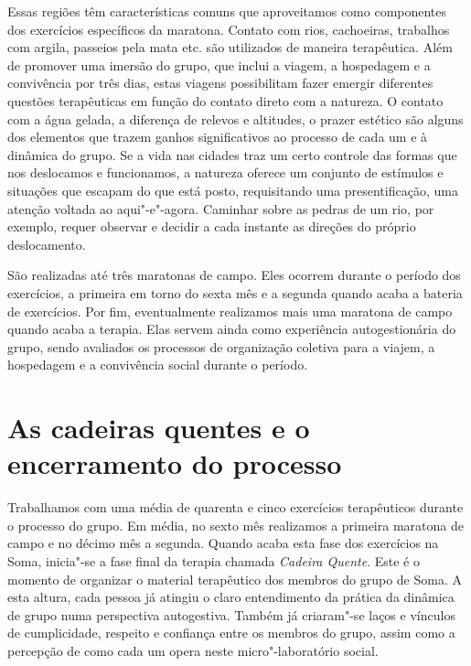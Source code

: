Essas regiões têm características comuns que aproveitamos como
componentes dos exercícios específicos da maratona. Contato com rios,
cachoeiras, trabalhos com argila, passeios pela mata etc. são utilizados
de maneira terapêutica. Além de promover uma imersão do grupo, que
inclui a viagem, a hospedagem e a convivência por três dias, estas viagens
possibilitam fazer emergir diferentes questões terapêuticas em função do
contato direto com a natureza. O contato com a água gelada, a diferença
de relevos e altitudes, o prazer estético são alguns dos elementos que
trazem ganhos significativos ao processo de cada um e à dinâmica do
grupo. Se a vida nas cidades traz um certo controle das formas
que nos deslocamos e funcionamos, a natureza oferece um conjunto de
estímulos e situações que escapam do que está posto, requisitando uma
presentificação, uma atenção voltada ao aqui"-e"-agora. Caminhar sobre as
pedras de um rio, por exemplo, requer observar e decidir a cada instante
as direções do próprio deslocamento.

São realizadas até três maratonas de campo. Eles ocorrem durante o
período dos exercícios, a primeira em torno do sexta mês e a segunda
quando acaba a bateria de exercícios. Por fim, eventualmente realizamos
mais uma maratona de campo quando acaba a terapia. Elas servem ainda
como experiência autogestionária do grupo, sendo avaliados os processos
de organização coletiva para a viajem, a hospedagem e a convivência
social durante o período.

\section{As cadeiras quentes e o encerramento do processo}

Trabalhamos com uma média de quarenta e cinco exercícios terapêuticos
durante o processo do grupo. Em média, no sexto mês realizamos a
primeira maratona de campo e no décimo mês a segunda. Quando acaba esta
fase dos exercícios na Soma, inicia"-se a fase final da terapia chamada
\emph{Cadeira Quente}. Este é o momento de organizar o material
terapêutico dos membros do grupo de Soma. A esta altura, cada pessoa já
atingiu o claro entendimento da prática da dinâmica de grupo numa
perspectiva autogestiva. Também já criaram"-se laços e vínculos de
cumplicidade, respeito e confiança entre os membros do grupo, assim como
a percepção de como cada um opera neste micro"-laboratório social.

